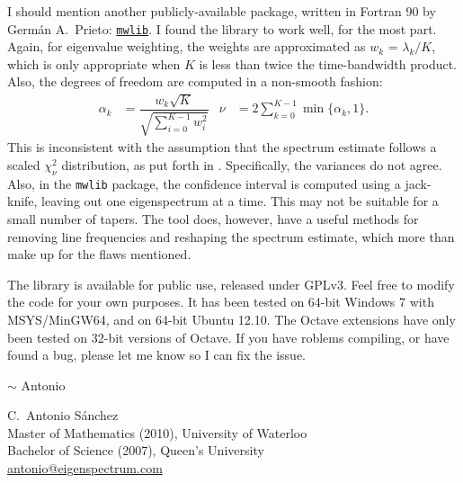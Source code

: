 I should mention another publicly-available package, written in Fortran 90 by 
Germ\'an A.~Prieto: \href{http://wwwprof.uniandes.edu.co/~gprieto/software/%
mwlib.html}{\texttt{mwlib}}.  I found the library to work well, for the most
part.  Again, for eigenvalue weighting, the weights are approximated as 
$w_k$ = $\lambda_k/K$, which is only appropriate when $K$ is less than twice 
the time-bandwidth product.  Also, the degrees of freedom are computed in a 
non-smooth fashion:
\begin{align*}
    \alpha_k & = \dfrac{w_k\sqrt{K}}{\sqrt{\sum_{i=0}^{K-1} w_i^2}} %
        & \nu & = 2\sum_{k=0}^{K-1} \min\{\alpha_k,1\}.
\end{align*}
This is inconsistent with the assumption that the spectrum estimate follows a
scaled $\chi^2_\nu$ distribution, as put forth in \cite{percival:multitaper,%
thomson:multitaper,thomson:lecture}. Specifically, the variances do not agree.
Also, in the \texttt{mwlib} package, the confidence interval is computed using
a jack-knife, leaving out one eigenspectrum at a time.  This may not be 
suitable for a small number of tapers.  The tool does, however, have a useful 
methods for removing line frequencies and reshaping the spectrum estimate, 
which more than make up for the flaws mentioned.

The  library is available for public use, released under GPLv3.  
Feel free to modify the code for your own purposes.  It has been tested on 
64-bit Windows 7 with MSYS/MinGW64, and on 64-bit Ubuntu 12.10.  The Octave
extensions have only been tested on 32-bit versions of Octave.  If you have 
roblems compiling, or have found a bug, please let me know so I can fix the 
issue.
\smallskip

\hfill $\sim$ Antonio\hspace*{4ex}
\bigskip

\vfill
\noindent \parbox{\textwidth}{
C.~Antonio S\'anchez\\
Master of Mathematics (2010), University of Waterloo\\
Bachelor of Science (2007), Queen's University\\
\href{mailto:antonio@eigenspectrum.com}{antonio@eigenspectrum.com}
}
\smallskip
